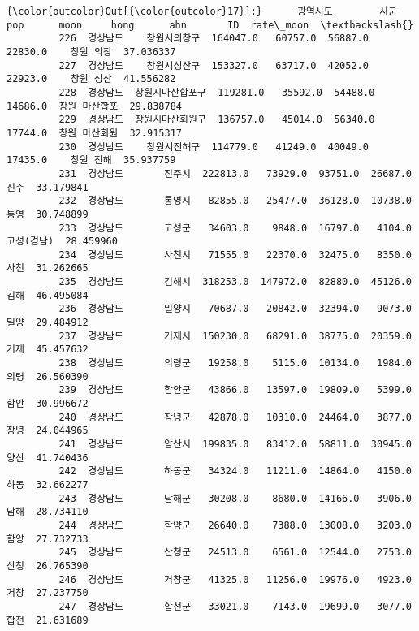 \documentclass[11pt]{article}
\begin{document}
\begin{Verbatim}[commandchars=\\\{\}]
{\color{outcolor}Out[{\color{outcolor}17}]:}      광역시도        시군       pop      moon     hong      ahn       ID  rate\_moon  \textbackslash{}
         226  경상남도    창원시의창구  164047.0   60757.0  56887.0  22830.0    창원 의창  37.036337   
         227  경상남도    창원시성산구  153327.0   63717.0  42052.0  22923.0    창원 성산  41.556282   
         228  경상남도  창원시마산합포구  119281.0   35592.0  54488.0  14686.0  창원 마산합포  29.838784   
         229  경상남도  창원시마산회원구  136757.0   45014.0  56340.0  17744.0  창원 마산회원  32.915317   
         230  경상남도    창원시진해구  114779.0   41249.0  40049.0  17435.0    창원 진해  35.937759   
         231  경상남도       진주시  222813.0   73929.0  93751.0  26687.0       진주  33.179841   
         232  경상남도       통영시   82855.0   25477.0  36128.0  10738.0       통영  30.748899   
         233  경상남도       고성군   34603.0    9848.0  16797.0   4104.0   고성(경남)  28.459960   
         234  경상남도       사천시   71555.0   22370.0  32475.0   8350.0       사천  31.262665   
         235  경상남도       김해시  318253.0  147972.0  82880.0  45126.0       김해  46.495084   
         236  경상남도       밀양시   70687.0   20842.0  32394.0   9073.0       밀양  29.484912   
         237  경상남도       거제시  150230.0   68291.0  38775.0  20359.0       거제  45.457632   
         238  경상남도       의령군   19258.0    5115.0  10134.0   1984.0       의령  26.560390   
         239  경상남도       함안군   43866.0   13597.0  19809.0   5399.0       함안  30.996672   
         240  경상남도       창녕군   42878.0   10310.0  24464.0   3877.0       창녕  24.044965   
         241  경상남도       양산시  199835.0   83412.0  58811.0  30945.0       양산  41.740436   
         242  경상남도       하동군   34324.0   11211.0  14864.0   4150.0       하동  32.662277   
         243  경상남도       남해군   30208.0    8680.0  14166.0   3906.0       남해  28.734110   
         244  경상남도       함양군   26640.0    7388.0  13008.0   3203.0       함양  27.732733   
         245  경상남도       산청군   24513.0    6561.0  12544.0   2753.0       산청  26.765390   
         246  경상남도       거창군   41325.0   11256.0  19976.0   4923.0       거창  27.237750   
         247  경상남도       합천군   33021.0    7143.0  19699.0   3077.0       합천  21.631689   
         

\end{Verbatim}
\end{document}
